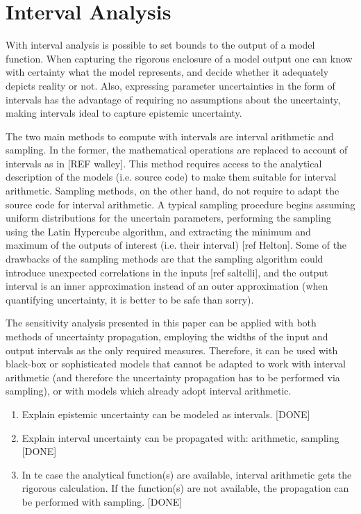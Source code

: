\documentclass[twocolumn]{rps-esrel2022}
\begin{document}
\section{Interval Analysis}

With interval analysis is possible to set bounds to the output of a model function.
When capturing the rigorous enclosure of a model output one can know with certainty what the model represents, and decide
whether it adequately depicts reality or not.
Also, expressing parameter uncertainties in the form of intervals has the advantage of requiring no assumptions about the uncertainty, making intervals ideal to
capture epistemic uncertainty.

The two main methods to compute with intervals are interval arithmetic and sampling.
In the former, the mathematical operations are replaced to account of intervals as in [REF walley].
This method requires access to the analytical description of the models (i.e. source code) to make them suitable for
interval arithmetic.
Sampling methods, on the other hand, do not require to adapt the source code for interval arithmetic.
A typical sampling procedure begins assuming uniform distributions for the uncertain parameters, performing
the sampling using the Latin Hypercube algorithm, and extracting the minimum and maximum of the outputs of interest (i.e. their
interval) [ref Helton].
Some of the drawbacks of the sampling methods are that the sampling algorithm could introduce unexpected correlations in the inputs [ref saltelli],
and the output interval is an inner approximation instead of an outer approximation (when quantifying uncertainty, it is better to be safe than sorry).

The sensitivity analysis presented in this paper can be applied with both methods of uncertainty propagation, employing the widths of the input and output intervals as
the only required measures.
Therefore, it can be used with black-box or sophisticated models that cannot be adapted to work with interval arithmetic (and therefore the uncertainty propagation
has to be performed via sampling), or with models which already adopt interval arithmetic.

\begin{enumerate}
	\item Explain epistemic uncertainty can be modeled as intervals. [DONE]
	\item Explain interval uncertainty can be propagated with: arithmetic, sampling [DONE]
	\item In te case the analytical function(s) are available, interval arithmetic gets the rigorous calculation.
	If the function(s) are not available, the propagation can be performed with sampling. [DONE]
\end{enumerate}
\end{document}
